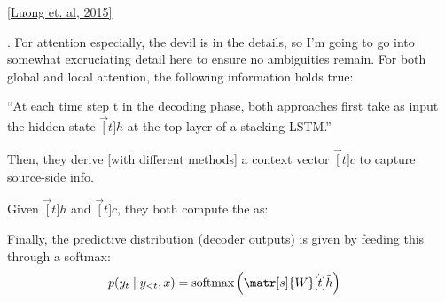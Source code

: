\documentclass[11pt]{article}
\begin{document}

\href{https://arxiv.org/abs/1508.04025}{[Luong et. al, 2015]}

\p {}. For attention especially, the devil is in the details, so I'm going to go into somewhat excruciating detail here to ensure no ambiguities remain. For both global and local attention, the following information holds true:
\begin{compactitem}
	\item ``At each time step t in the decoding phase, both approaches first take as input the hidden state $\vec[t]{h}$ at the top layer of a stacking LSTM.'' 
	\item Then, they derive [with different methods] a context vector $\vec[t]{c}$ to capture source-side info.
	\item Given $\vec[t]{h}$ and $\vec[t]{c}$, they both compute the  as:
	
	\item Finally, the predictive distribution (decoder outputs) is given by feeding this through a softmax:
	\begin{align}
	p(y_t \mid y_{<t}, x) &= \text{softmax}\left(  \matr[s]{W} \vec[t]{\tilde h}   \right)
	\end{align}
\end{compactitem}
\end{document}
